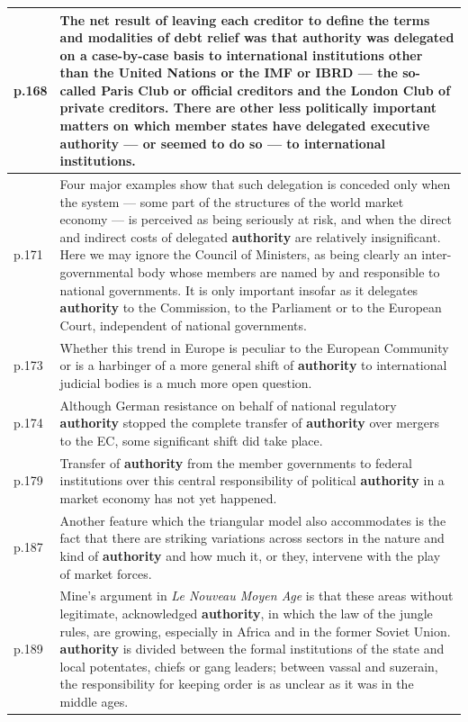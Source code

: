 \begin{longtable}{p{1.2cm} p{13cm}}
p.168 & The net result of leaving each creditor to define the terms and modalities of debt relief was that \textbf{authority} was delegated on a case-by-case basis to international institutions other than the United Nations or the IMF or IBRD --- the so-called Paris Club or official creditors and the London Club of private creditors. There are other less politically important matters on which member states have delegated executive \textbf{authority} --- or seemed to do so --- to international institutions. \\
\midrule

p.171 & Four major examples show that such delegation is conceded only when the system --- some part of the structures of the world market economy --- is perceived as being seriously at risk, and when the direct and indirect costs of delegated \textbf{authority} are relatively insignificant. Here we may ignore the Council of Ministers, as being clearly an inter-governmental body whose members are named by and responsible to national governments. It is only important insofar as it delegates \textbf{authority} to the Commission, to the Parliament or to the European Court, independent of national governments. \\
\midrule

p.173 & Whether this trend in Europe is peculiar to the European Community or is a harbinger of a more general shift of \textbf{authority} to international judicial bodies is a much more open question. \\
\midrule

p.174 & Although German resistance on behalf of national regulatory \textbf{authority} stopped the complete transfer of \textbf{authority} over mergers to the EC, some significant shift did take place. \\
\midrule

p.179 & Transfer of \textbf{authority} from the member governments to federal institutions over this central responsibility of political \textbf{authority} in a market economy has not yet happened. \\
\midrule

p.187 & Another feature which the triangular model also accommodates is the fact that there are striking variations across sectors in the nature and kind of \textbf{authority} and how much it, or they, intervene with the play of market forces. \\
\midrule

p.189 & Mine's argument in \emph{Le Nouveau Moyen Age} is that these areas without legitimate, acknowledged \textbf{authority}, in which the law of the jungle rules, are growing, especially in Africa and in the former Soviet Union. \textbf{authority} is divided between the formal institutions of the state and local potentates, chiefs or gang leaders; between vassal and suzerain, the responsibility for keeping order is as unclear as it was in the middle ages. \\
\midrule


\end{longtable}
